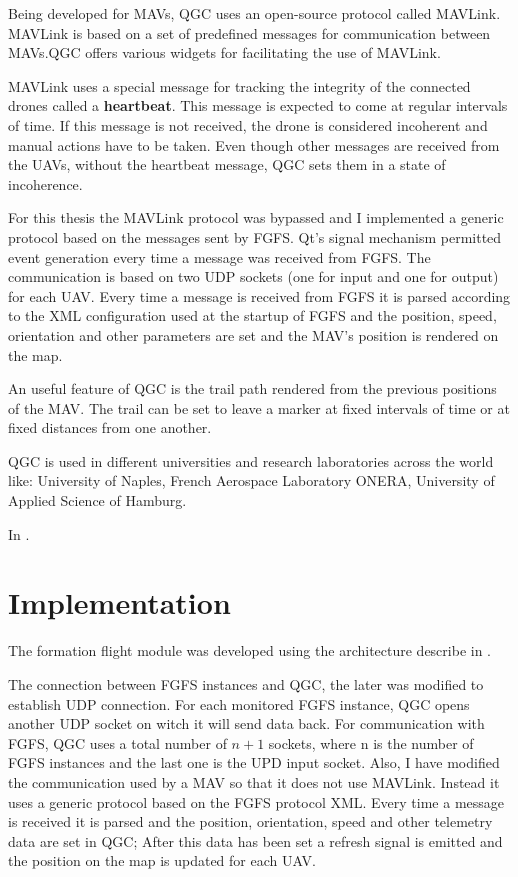 Being developed for MAVs,  QGC uses
an open-source protocol called MAVLink. MAVLink is based on a set of predefined
messages for communication between MAVs.QGC offers various widgets for facilitating
the use of MAVLink.

MAVLink uses a special message for tracking the integrity of the connected drones
called a \textbf{heartbeat}. This message is expected to come at regular intervals
of time. If this message is not received, the drone is considered incoherent
and manual actions have to be taken. Even though other messages are received from
the UAVs, without the heartbeat message, QGC sets them in a state of incoherence.

For this thesis the MAVLink protocol was bypassed and I implemented a generic
protocol based on the messages sent by FGFS. Qt's signal mechanism permitted
event generation every time a message was received from FGFS. The communication
is based on two UDP sockets (one for input and one for output) for each UAV. 
Every time a message is received from FGFS it is parsed according to the XML 
configuration used at the startup of FGFS and the position, speed, orientation
and other parameters are set and the MAV's position is rendered on the map.

An useful feature of QGC is the trail path rendered from the previous positions
of the MAV. The trail can be set to leave a marker at fixed intervals of time
or at fixed distances from one another.

QGC is used in different universities and research laboratories across the world 
like: University of Naples, French Aerospace Laboratory ONERA,  University of 
Applied Science of Hamburg.

In .

\newpage
\section{Implementation}
\label{sec:code}

The formation flight module was developed using the architecture describe in 
.

The connection between FGFS instances and QGC, the later was modified to establish
UDP connection. For each monitored FGFS instance,  QGC opens another UDP socket
on witch it will send data back. For communication with FGFS, QGC uses a total
number of $n+1$ sockets, where n is the number of FGFS instances and the last
one is the UPD input socket. Also, I have modified the communication used
by a MAV so that it does not use MAVLink. Instead it uses a generic protocol
based on the FGFS protocol XML. Every time a message is received it is parsed
and the position, orientation, speed and other telemetry data are set in 
QGC; After this data has been set a refresh signal is emitted and the position
on the map is updated for each UAV.

